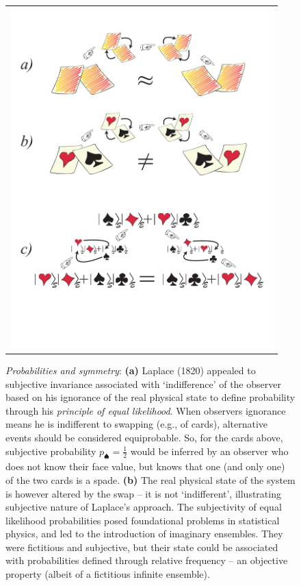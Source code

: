 \documentclass[aps,twocolumn,rmp,epsfig]{revtex4}
\newcommand{\+}         {\dagger}
\begin{document}
\begin{figure}[tb]
\begin{tabular}{l}
\vspace{-0.15in} 
\includegraphics[width=4.0in]{allcards.pdf}\\
\end{tabular}
\caption{{\it Probabilities and symmetry}: 
{\bf (a)} Laplace (1820) appealed to subjective invariance associated with `indifference' of the observer based on his ignorance of the real physical state to define probability through his {\it principle of equal likelihood}. When observers ignorance means he is indifferent to swapping (e.g., of cards), alternative 
events should be considered equiprobable. So, for the cards above, subjective probability 
$p_\spadesuit ={ \frac 1 2}$ would be inferred by an observer who does not know their face value, 
but knows that one (and only one) of the two cards is a spade.
{\bf (b)} The real physical state of the system is however altered by the swap -- it is not `indifferent',
illustrating subjective nature of Laplace's approach. The subjectivity of equal likelihood probabilities 
posed foundational problems in statistical physics, and led to the introduction of imaginary ensembles. 
They were fictitious and  subjective, but their state could be associated with probabilities 
defined through relative frequency -- an objective property (albeit of a fictitious infinite ensemble).
}
\end{figure}
\end{document}
